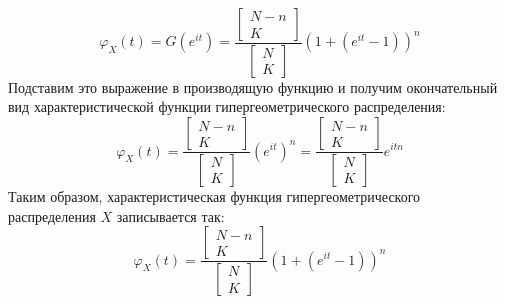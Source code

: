 \documentclass[a4paper, 12pt]{article}
\begin{document}
    $$
    \varphi_X(t)=G(e^{it})=\dfrac{
        \begin{bmatrix}
            N-n\\
            K
        \end{bmatrix}
    }{
        \begin{bmatrix}
            N\\
            K
        \end{bmatrix}
    }(1+(e^{it}-1))^n
    $$
    Подставим это выражение в производящую функцию и получим окончательный вид характеристической функции гипергеометрического распределения:
    $$
    \varphi_X(t)=\dfrac{
        \begin{bmatrix}
            N-n\\
            K
        \end{bmatrix}
    }{
        \begin{bmatrix}
            N\\
            K
        \end{bmatrix}
    }(e^{it})^n
    =\dfrac{
        \begin{bmatrix}
            N-n\\
            K
        \end{bmatrix}
    }{
        \begin{bmatrix}
            N\\
            K
        \end{bmatrix}
    }e^{itn}
    $$
    Таким образом, характеристическая функция гипергеометрического распределения $X$ записывается так:
    $$
    \varphi_X(t)=
    \dfrac{
        \begin{bmatrix}
            N-n\\
            K
        \end{bmatrix}
    }{
        \begin{bmatrix}
            N\\
            K
        \end{bmatrix}
    }(1+(e^{it}-1))^n
    $$
\end{document}
